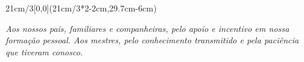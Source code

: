 \begin{textblock*}{21cm/3}[0,0](21cm/3*2-2cm,29.7cm-6cm)
  \begin{flushright}
    {\emph{
           Aos nossos pais, familiares e companheiras, pelo apoio e incentivo em nossa formação pessoal. Aos mestres, pelo conhecimento transmitido e pela paciência que tiveram conosco.
          }
    }
  \end{flushright}
\end{textblock*}

\null\newpage

